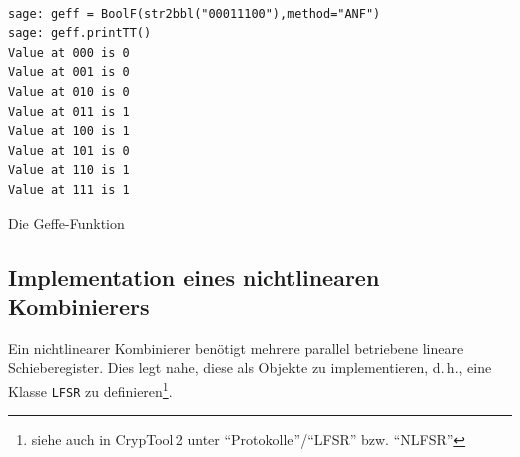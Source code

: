 \begin{refsegment}
\begin{sagecode}
\begin{verbatim}

sage: geff = BoolF(str2bbl("00011100"),method="ANF")
sage: geff.printTT()
Value at 000 is 0
Value at 001 is 0
Value at 010 is 0
Value at 011 is 1
Value at 100 is 1
Value at 101 is 0
Value at 110 is 1
Value at 111 is 1
\end{verbatim}
\caption{Die Geffe-Funktion}\label{Sage-code-bool-gef}
\end{sagecode}

\subsection{Implementation eines nichtlinearen Kombinierers}\label{ss-bool-ncsr}

Ein nichtlinearer Kombinierer benötigt mehrere parallel betriebene
lineare Schieberegister. Dies legt nahe, diese als Objekte zu
implementieren, d.\,h., eine Klasse {\tt LFSR} zu definieren\footnote{%
   siehe auch in CrypTool\,2 unter "`Protokolle"'/"`LFSR"' bzw. "`NLFSR"'
}.


\end{refsegment}
